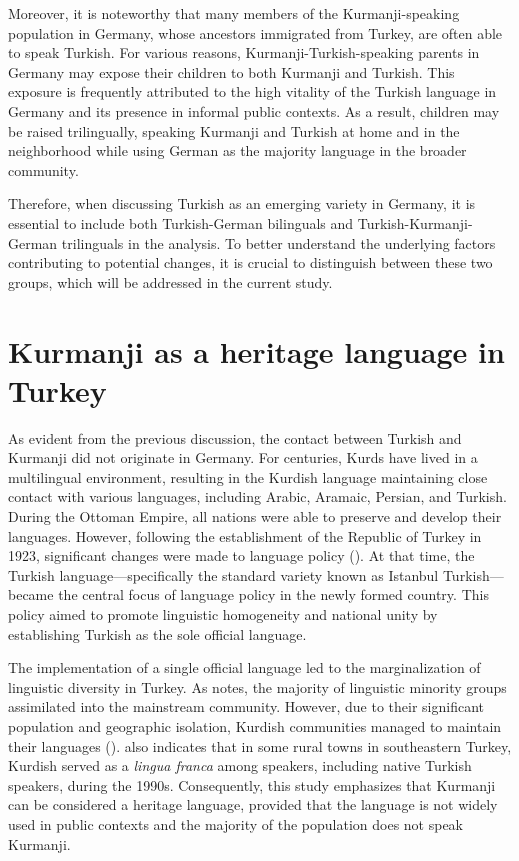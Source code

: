Moreover, it is noteworthy that many members of the Kurmanji-speaking population in Germany, whose ancestors immigrated from Turkey, are often able to speak Turkish. For various reasons, Kurmanji-Turkish-speaking parents in Germany may expose their children to both Kurmanji and Turkish. This exposure is frequently attributed to the high vitality of the Turkish language in Germany and its presence in informal public contexts. As a result, children may be raised trilingually, speaking Kurmanji and Turkish at home and in the neighborhood while using German as the majority language in the broader community.

Therefore, when discussing Turkish as an emerging variety in Germany, it is essential to include both Turkish-German bilinguals and Turkish-Kurmanji-German trilinguals in the analysis. To better understand the underlying factors contributing to potential changes, it is crucial to distinguish between these two groups, which will be addressed in the current study.

\section{Kurmanji as a heritage language in Turkey}\label{sec:key:2.3}

As evident from the previous discussion, the contact between Turkish and Kurmanji did not originate in Germany. For centuries, Kurds have lived in a multilingual environment, resulting in the Kurdish language maintaining close contact with various languages, including Arabic, Aramaic, Persian, and Turkish. During the Ottoman Empire, all nations were able to preserve and develop their languages. However, following the establishment of the Republic of Turkey in 1923, significant changes were made to language policy (\citealt{Yagmur2001}). At that time, the Turkish language—specifically the standard variety known as Istanbul Turkish—became the central focus of language policy in the newly formed country. This policy aimed to promote linguistic homogeneity and national unity by establishing Turkish as the sole official language.

The implementation of a single official language led to the marginalization of linguistic diversity in Turkey. As \citet{Yagmur2001} notes, the majority of linguistic minority groups assimilated into the mainstream community. However, due to their significant population and geographic isolation, Kurdish communities managed to maintain their languages (\citealt{Yagmur2001}). \citet{Dorleijn1996} also indicates that in some rural towns in southeastern Turkey, Kurdish served as a \textit{lingua franca} among speakers, including native Turkish speakers, during the 1990s. Consequently, this study emphasizes that Kurmanji can be considered a heritage language, provided that the language is not widely used in public contexts and the majority of the population does not speak Kurmanji.

